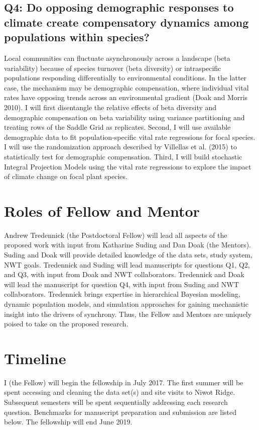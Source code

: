 \documentclass[12pt,]{article}
\begin{document}
\subsection{Q4: Do opposing demographic responses to climate create compensatory dynamics among populations within species?}

Local communities can fluctuate asynchronously across a landscape (beta
variability) because of species turnover (beta diversity) or
intraspecific populations responding differentially to environmental
conditions. In the latter case, the mechanism may be demographic
compensation, where individual vital rates have opposing trends across
an environmental gradient (Doak and Morris 2010). I will first
disentangle the relative effects of beta diversity and demographic
compensation on beta variability using variance partitioning and
treating rows of the Saddle Grid as replicates. Second, I will use
available demographic data to fit population-specific vital rate
regressions for focal species. I will use the randomization approach
described by Villellas et al. (2015) to statistically test for
demographic compensation. Third, I will build stochastic Integral
Projection Models using the vital rate regressions to explore the impact
of climate change on focal plant species.

\section{Roles of Fellow and Mentor}

Andrew Tredennick (the Postdoctoral Fellow) will lead all aspects of the
proposed work with input from Katharine Suding and Dan Doak (the
Mentors). Suding and Doak will provide detailed knowledge of the data
sets, study system, NWT goals. Tredennick and Suding will lead
manuscripts for questions Q1, Q2, and Q3, with input from Doak and NWT
collaborators. Tredennick and Doak will lead the manuscript for question
Q4, with input from Suding and NWT collaborators. Tredennick brings
expertise in hierarchical Bayesian modeling, dynamic population models,
and simulation approaches for gaining mechanistic insight into the
drivers of synchrony. Thus, the Fellow and Mentors are uniquely poised
to take on the proposed research.

\section{Timeline}

I (the Fellow) will begin the fellowship in July 2017. The first summer
will be spent accessing and cleaning the data set(s) and site visits to
Niwot Ridge. Subsequent semesters will be spent sequentially addressing
each research question. Benchmarks for manuscript preparation and
submission are listed below. The fellowship will end June 2019.
\end{document}
